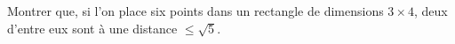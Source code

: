 Montrer que, si l'on place six points dans un rectangle de dimensions $3 \times 4$, deux d'entre eux sont à une distance $\leq \sqrt{5}$.
